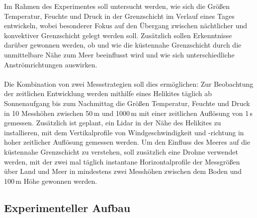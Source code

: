 \documentclass[a4paper,11pt,DIV=calc,tablecaptionabove,headinclude,twoside]{article}
\begin{document}
Im Rahmen des Experimentes soll untersucht werden, wie sich die Größen Temperatur, Feuchte und Druck in der Grenzschicht im Verlauf eines Tages entwickeln, wobei besonderer Fokus auf den Übergang zwischen nächtlicher und konvektiver Grenzschicht gelegt werden soll. Zusätzlich sollen Erkenntnisse darüber gewonnen werden, ob und wie die küstennahe Grenzschicht durch die unmittelbare Nähe zum Meer beeinflusst wird und wie sich unterschiedliche Anströmrichtungen auswirken. \\\\
Die Kombination von zwei Messstrategien soll dies ermöglichen: Zur Beobachtung der zeitlichen Entwicklung werden mithilfe eines Helikites täglich ab Sonnenaufgang bis zum Nachmittag die Größen Temperatur, Feuchte und Druck in 10 Messhöhen zwischen 50\,m und 1000\,m mit einer zeitlichen Auflösung von 1\,s gemessen. Zusätzlich ist geplant, ein Lidar in der Nähe des Helikites zu installieren, mit dem Vertikalprofile von Windgeschwindigkeit und -richtung in hoher zeitlicher Auflösung gemessen werden. %
Um den Einfluss des Meeres auf die küstennahe Grenzschicht zu verstehen, soll zusätzlich eine Drohne verwendet werden, mit der zwei mal täglich instantane Horizontalprofile der Messgrößen über Land und Meer in mindestens zwei Messhöhen zwischen dem Boden und 100\,m Höhe gewonnen werden.
\subsection{Experimenteller Aufbau}
\label{Aufbau}
\end{document}
